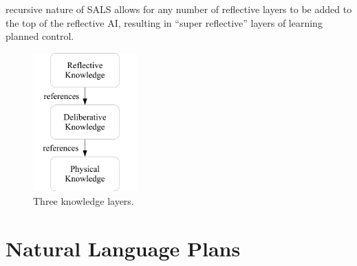 recursive nature of SALS allows for any number of reflective layers to
be added to the top of the reflective AI, resulting in ``super
reflective'' layers of learning planned control.
\begin{figure}
  \center
  \includegraphics[width=4cm]{gfx/three_knowledge_layers}
  \caption{Three knowledge layers.}
  \label{figure:three_knowledge_layers}
\end{figure}

\section{Natural Language Plans}

